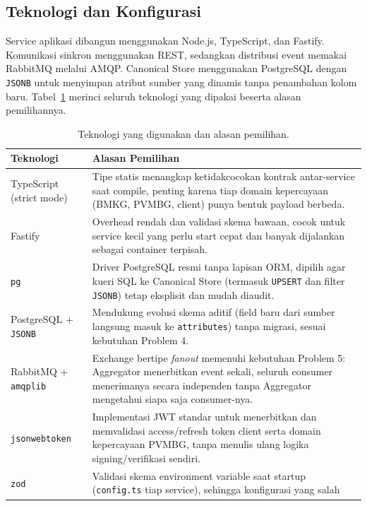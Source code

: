 \subsection{Teknologi dan Konfigurasi}

Service aplikasi dibangun menggunakan Node.js, TypeScript, dan Fastify.
Komunikasi sinkron menggunakan REST, sedangkan distribusi event memakai RabbitMQ
melalui AMQP. Canonical Store menggunakan PostgreSQL dengan \texttt{JSONB}
untuk menyimpan atribut sumber yang dinamis tanpa penambahan kolom baru.
Tabel~\ref{tab:teknologi} merinci seluruh teknologi yang dipakai beserta
alasan pemilihannya.

\begin{table}[H]
  \centering
  \caption{Teknologi yang digunakan dan alasan pemilihan.}
  \label{tab:teknologi}
  \begin{tabularx}{\textwidth}{@{}p{}X@{}}
    \toprule
    \textbf{Teknologi} & \textbf{Alasan Pemilihan} \\
    \midrule
    TypeScript (strict mode) & Tipe statis menangkap ketidakcocokan kontrak
    antar-service saat compile, penting karena tiap domain kepercayaan
    (BMKG, PVMBG, client) punya bentuk payload berbeda. \\
    Fastify & Overhead rendah dan validasi skema bawaan, cocok untuk service
    kecil yang perlu start cepat dan banyak dijalankan sebagai container
    terpisah. \\
    \texttt{pg} & Driver PostgreSQL resmi tanpa lapisan ORM, dipilih agar
    kueri SQL ke Canonical Store (termasuk \texttt{UPSERT} dan filter
    \texttt{JSONB}) tetap eksplisit dan mudah diaudit. \\
    PostgreSQL + \texttt{JSONB} & Mendukung evolusi skema aditif (field baru
    dari sumber langsung masuk ke \texttt{attributes}) tanpa migrasi, sesuai
    kebutuhan Problem 4. \\
    RabbitMQ + \texttt{amqplib} & Exchange bertipe \textit{fanout} memenuhi
    kebutuhan Problem 5: Aggregator menerbitkan event sekali, seluruh
    consumer menerimanya secara independen tanpa Aggregator mengetahui
    siapa saja consumer-nya. \\
    \texttt{jsonwebtoken} & Implementasi JWT standar untuk menerbitkan dan
    memvalidasi access/refresh token client serta domain kepercayaan PVMBG,
    tanpa menulis ulang logika signing/verifikasi sendiri. \\
    \texttt{zod} & Validasi skema environment variable saat startup
    (\texttt{config.ts} tiap service), sehingga konfigurasi yang salah

\end{tabularx}
\end{table}
